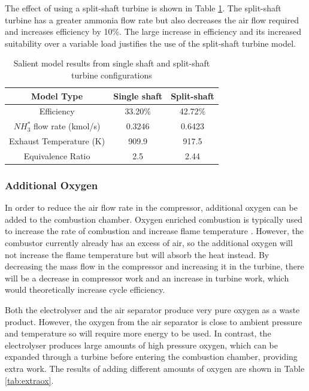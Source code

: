 The effect of using a split-shaft turbine is shown in Table \ref{tab:splitshaft}. The split-shaft turbine has a greater ammonia flow rate but also decreases the air flow required and increases efficiency by 10\%. The large increase in efficiency and its increased suitability over a variable load justifies the use of the split-shaft turbine model. 

\begin {table} [h]
\begin{center}
\caption{Salient model results from single shaft and split-shaft turbine configurations} \label{tab:splitshaft} 
\begin{tabular}{ |c|c|c| }
 \hline
  Model Type & Single shaft & Split-shaft\\ 
 \hline
  Efficiency & 33.20\% & 42.72\% \\ 
  \hline
  $NH_3^*$ flow rate (kmol/s) & 0.3246 & 0.6423\\ 
 \hline
  Exhaust Temperature (K) & 909.9 & 917.5\\
  \hline
  Equivalence Ratio & 2.5 & 2.44\\
 \hline
\end{tabular}
\end{center}  
\end {table}

\subsubsection{Additional Oxygen}
In order to reduce the air flow rate in the compressor, additional oxygen can be added to the combustion chamber. Oxygen enriched combustion is typically used to increase the rate of combustion and increase flame temperature \cite{oxyfuel}. However, the combustor currently already has an excess of air, so the additional oxygen will not increase the flame temperature but will absorb the heat instead. By decreasing the mass flow in the compressor and increasing it in the turbine, there will be a decrease in compressor work and an increase in turbine work, which would theoretically increase cycle efficiency. 

Both the electrolyser and the air separator produce very pure oxygen as a waste product. However, the oxygen from the air separator is close to ambient pressure and temperature so will require more energy to be used. In contrast, the electrolyser produces large amounts of high pressure oxygen, which can be expanded through a turbine before entering the combustion chamber, providing extra work. The results of adding different amounts of oxygen are shown in Table \ref{tab:extraox}.

